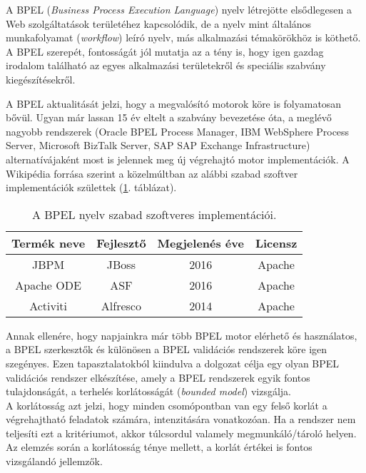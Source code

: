 

A BPEL (\textit{Business Process Execution Language}) nyelv létrejötte elsődlegesen a Web szolgáltatások területéhez kapcsolódik, de a nyelv mint általános munkafolyamat (\textit{workflow}) leíró nyelv, más alkalmazási témakörökhöz is köthető. A BPEL szerepét, fontosságát jól mutatja az a tény is, hogy igen gazdag irodalom található az egyes alkalmazási területekről és speciális szabvány kiegészítésekről.

A  BPEL aktualitását jelzi, hogy a megvalósító motorok köre is folyamatosan bővül. Ugyan már lassan 15 év eltelt a szabvány bevezetése óta, a meglévő nagyobb rendszerek (Oracle BPEL Process Manager, IBM WebSphere Process Server, Microsoft BizTalk Server, SAP SAP Exchange Infrastructure) alternatívájaként  most is jelennek meg új végrehajtó motor implementációk. A Wikipédia forrása szerint \cite{wikiBpelList} a közelmúltban az alábbi szabad szoftver implementációk születtek (\ref{tab:bpel_softwares}. táblázat).

\begin{table}[h!]
\centering
\caption{A BPEL nyelv szabad szoftveres implementációi.}
\label{tab:bpel_softwares}
\begin{tabular}{|c|c|c|c|}
\hline
\textbf{Termék neve} & \textbf{Fejlesztő} & \textbf{Megjelenés éve} & \textbf{Licensz}\\
\hline
JBPM & JBoss & 2016 & Apache\\
Apache ODE & ASF & 2016 & Apache\\
Activiti & Alfresco & 2014 & Apache\\
\hline
\end{tabular}
\end{table}

Annak ellenére, hogy napjainkra már több BPEL motor elérhető és használatos, a BPEL szerkesztők és különösen a BPEL validációs rendszerek köre igen szegényes. Ezen tapasztalatokból kiindulva a dolgozat célja egy olyan BPEL validációs rendszer elkészítése, amely a BPEL rendszerek egyik fontos tulajdonságát, a terhelés korlátosságát (\textit{bounded model}) vizsgálja. \\
A korlátosság azt jelzi, hogy minden csomópontban van egy felső korlát a végrehajtható feladatok számára, intenzitására vonatkozóan. Ha a rendszer nem teljesíti ezt a kritériumot, akkor túlcsordul valamely megmunkáló/tároló helyen. Az elemzés során a korlátosság ténye mellett, a korlát értékei is fontos vizsgálandó jellemzők. 

